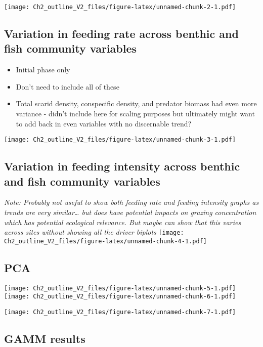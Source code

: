 \documentclass[]{article}
\providecommand{\tightlist}{%
  \setlength{\itemsep}{0pt}\setlength{\parskip}{0pt}}
\begin{document}
\texttt{[image: Ch2\_outline\_V2\_files/figure-latex/unnamed-chunk-2-1.pdf]}

\subsection{Variation in feeding rate across benthic and fish community
variables}\label{variation-in-feeding-rate-across-benthic-and-fish-community-variables}

\begin{itemize}
\tightlist
\item
  Initial phase only
\item
  Don't need to include all of these
\item
  Total scarid density, conspecific density, and predator biomass had
  even more variance - didn't include here for scaling purposes but
  ultimately might want to add back in even variables with no
  discernable trend?
\end{itemize}

\texttt{[image: Ch2\_outline\_V2\_files/figure-latex/unnamed-chunk-3-1.pdf]}

\subsection{Variation in feeding intensity across benthic and fish
community
variables}\label{variation-in-feeding-intensity-across-benthic-and-fish-community-variables}

\emph{\emph{Note:} Probably not useful to show both feeding rate and
feeding intensity graphs as trends are very similar\ldots{} but does
have potential impacts on grazing concentration which has potential
ecological relevance. But maybe can show that this varies across sites
without showing all the driver biplots}
\texttt{[image: Ch2\_outline\_V2\_files/figure-latex/unnamed-chunk-4-1.pdf]}

\subsection{PCA}\label{pca}

\texttt{[image: Ch2\_outline\_V2\_files/figure-latex/unnamed-chunk-5-1.pdf]}
\texttt{[image: Ch2\_outline\_V2\_files/figure-latex/unnamed-chunk-6-1.pdf]}

\texttt{[image: Ch2\_outline\_V2\_files/figure-latex/unnamed-chunk-7-1.pdf]}

\subsection{GAMM results}\label{gamm-results}
\end{document}
